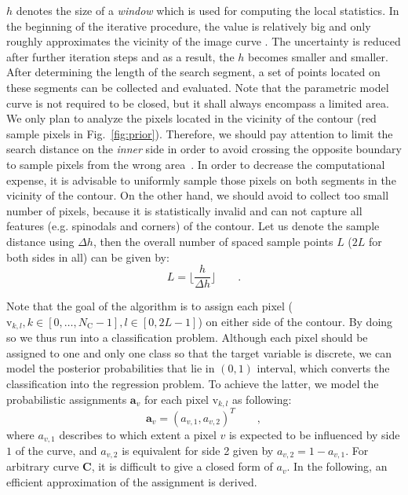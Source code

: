 $h$ denotes the size of a \textit{window} which is used for computing
the local statistics. In the beginning of the iterative procedure, the value
is relatively big and only roughly approximates the vicinity of the image curve
. The
uncertainty is reduced after further iteration steps and as a result, the $h$ becomes smaller and
smaller. After determining the length of the search segment, 
a set of points located on these segments can be collected and
evaluated. Note that the parametric model curve is not required to be
closed, but it shall always encompass a limited area. We only plan to
analyze the pixels located in the vicinity of the contour (red sample
pixels in Fig.~\ref{fig:prior}). Therefore,
we should pay attention to limit the search distance on the
\textit{inner} side in order to avoid crossing the opposite
boundary to sample pixels from the wrong area~\cite{panin2006fully}. In order to
decrease the computational expense, it is advisable to uniformly sample those
pixels on both segments in the vicinity of the contour. On the other
hand, we should avoid to collect too small number of pixels, because
it is statistically invalid and can not
capture all features (e.g. spinodals and corners) of the contour. Let us denote the
sample distance using $\Delta h$, then the overall number of spaced
sample points $L$ ($2L$ for both sides in all) can be given by:
\begin{equation}
  \label{eq:sample}
  L = \lfloor \frac{h}{\Delta h} \rfloor\qquad.
\end{equation}

Note that the goal of the algorithm is to assign each pixel
($\mathrm{v}_{k,l}, k \in [0,\ldots,N_{\mathrm{C}}-1], l \in [0,
2L-1]$) on either side of the contour. By doing so we thus run into a
classification problem.
Although each pixel should be assigned to one and only
one class so that the target variable is discrete, we can model the
posterior probabilities that lie in $(0,1)$ interval, which converts the classification into the regression problem. To achieve the latter, we model the probabilistic
assignments $\mathbf{a}_{v}$ for each pixel $\mathrm{v}_{k,l}$ as following:
\begin{equation}
  \label{eq:pa}
  \mathbf{a}_v  = (a_{v,1}, a_{v,2})^T\qquad,
\end{equation}
where $a_{v,1}$ describes to which extent a pixel $v$ is expected to
be influenced by side $1$ of the curve, and $a_{v,2}$ is equivalent
for side 2 given by $a_{v,2} = 1- a_{v,1}$. For arbitrary curve
$\mathbf{C}$, it is difficult to give a closed form of $a_v$. In the
following, an efficient approximation of the assignment is derived.

